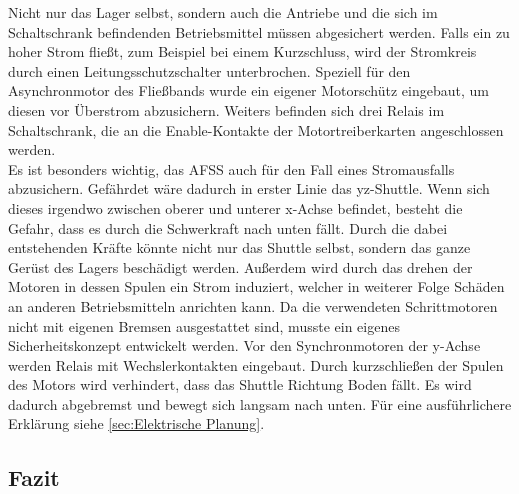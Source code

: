 Nicht nur das Lager selbst, sondern auch die Antriebe und die sich im Schaltschrank befindenden Betriebsmittel müssen abgesichert werden. Falls ein zu hoher Strom fließt, zum Beispiel bei einem Kurzschluss, wird der Stromkreis durch einen Leitungsschutzschalter unterbrochen. Speziell für den Asynchronmotor des Fließbands wurde ein eigener Motorschütz eingebaut, um diesen vor Überstrom abzusichern. Weiters befinden sich drei Relais im Schaltschrank, die an die Enable-Kontakte der Motortreiberkarten angeschlossen werden.\\
Es ist besonders wichtig, das AFSS auch für den Fall eines Stromausfalls abzusichern. Gefährdet wäre dadurch in erster Linie das yz-Shuttle. Wenn sich dieses irgendwo zwischen oberer und unterer x-Achse befindet, besteht die Gefahr, dass es durch die Schwerkraft nach unten fällt. Durch die dabei entstehenden Kräfte könnte nicht nur das Shuttle selbst, sondern das ganze Gerüst des Lagers beschädigt werden. Außerdem wird durch das drehen der Motoren in dessen Spulen ein Strom induziert, welcher in weiterer Folge Schäden an anderen Betriebsmitteln anrichten kann. Da die verwendeten Schrittmotoren nicht mit eigenen Bremsen ausgestattet sind, musste ein eigenes Sicherheitskonzept entwickelt werden. Vor den Synchronmotoren der y-Achse werden Relais mit Wechslerkontakten eingebaut. Durch kurzschließen der Spulen des Motors wird verhindert, dass das Shuttle Richtung Boden fällt. Es wird dadurch abgebremst und bewegt sich langsam nach unten. Für eine ausführlichere Erklärung siehe \ref{sec:Elektrische Planung}.

\subsection{Fazit}